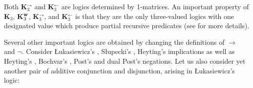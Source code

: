 \documentclass[10pt,a4paper]{article}
\theoremstyle{definition}
\newcommand{\3}{\vspace{.3in}}
\newcommand{\2}{\vspace{.2in}}
\newcommand{\1}{\vspace{.1in}}
\newcommand{\5}{\vspace{.05in}}
\begin{document}
Both {\bf K$_3^\rightarrow$} and {\bf K$_3^\leftarrow$} are logics determined by 1-matrices. An important property of {\bf K$_3$}, {\bf K}$_3^{\bf w}$, {\bf K$_3^\rightarrow$}, and {\bf K$_3^\leftarrow$} is that they are the only three-valued logics with one designated value which produce partial recursive predicates (see \cite{Kleene,Komendantskaya} for more details).

Several other important logics are obtained by changing the definitions of $\rightarrow$ and $ \neg $. Consider \L ukasiewicz's \cite{Lukasiewicz}, S\l upecki's \cite{Slupecki67}, Heyting's \cite{Heyting} implications as well as Heyting's \cite{Heyting}, Bochvar's \cite{Bochvar}, Post's and dual Post's \cite{Post21} negations. Let us also consider yet another pair of additive conjunction and disjunction, arising in \L ukasiewicz's logic:
\end{document}
